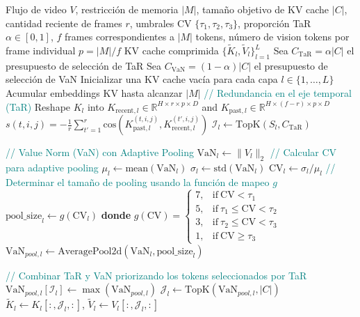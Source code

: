 \newpage
\begin{algorithm}[t]
\footnotesize
\caption{Algoritmo de InfiniPot-V}
\label{alg:infinipot_v}
\begin{algorithmic}[1]
\Require Flujo de video ${V}$, restricción de memoria $|M|$, tamaño objetivo de KV cache $|C|$, cantidad reciente de frames $r$, umbrales CV $\{\tau_1, \tau_2, \tau_3\}$, proporción TaR $\alpha \in [0,1]$, $f$ frames correspondientes a $|M|$ tokens, número de vision tokens por frame individual $p=|M|/f$ 
\Ensure KV cache comprimida $\{\tilde{K}_l, \tilde{V}_l\}_{l=1}^L$
\State Sea $C_{\text{TaR}} = \alpha|C|$ el presupuesto de selección de TaR
\State Sea $C_{\text{VaN}} = (1-\alpha)|C|$ el presupuesto de selección de VaN
\State Inicializar una KV cache vacía para cada capa $l \in \{1,\ldots,L\}$
    \State Acumular embeddings KV hasta alcanzar $|M|$ 
        \State \textcolor{teal}{// Redundancia en el eje temporal (TaR)}
        \State Reshape $K_l$ into $K_{\text{recent},l} \in \mathbb{R}^{H \times r \times p \times D}$ and $K_{\text{past},l} \in \mathbb{R}^{H \times (f-r) \times p \times D}$
            \State $s(t,i,j) = -\frac{1}{r}\sum_{t'=1}^{r}\text{cos}(K_{\text{past},l}^{(t,i,j)}, K_{\text{recent},l}^{(t',i,j)})$
        \EndFor
        \State $\mathcal{I}_l \gets \text{TopK}(S_l, C_{\text{TaR}})$ 
        
        \State \textcolor{teal}{// Value Norm (VaN) con Adaptive Pooling}
        \State $\text{VaN}_l \gets \|V_l\|_2$
        \State \textcolor{teal}{// Calcular CV para adaptive pooling}
        \State $\mu_l \gets \text{mean}(\text{VaN}_l)$
        \State $\sigma_l \gets \text{std}(\text{VaN}_l)$
        \State $\text{CV}_l \gets \sigma_l / \mu_l$
        \State \textcolor{teal}{// Determinar el tamaño de pooling usando la función de mapeo $g$}
\State $\text{pool\_size}_l \gets g(\text{CV}_l)$ 
\State \textbf{donde} $g(\text{CV}) = 
\begin{cases}
    7, & \text{if}\ \text{CV} < \tau_1 \\
    5, & \text{if}\ \tau_1 \leq \text{CV} < \tau_2 \\
    3, & \text{if}\ \tau_2 \leq \text{CV} < \tau_3 \\
    1, & \text{if}\ \text{CV} \geq \tau_3
\end{cases}$
        \State $\text{VaN}_{pool,l} \gets \text{AveragePool2d}(\text{VaN}_l, \text{pool\_size}_l)$
        
        \State \textcolor{teal}{// Combinar TaR y VaN priorizando los tokens seleccionados por TaR}
        \State $\text{VaN}_{pool,l}[\mathcal{I}_l] \gets \max(\text{VaN}_{pool,l})$ 
        \State $\mathcal{J}_l \gets \text{TopK}(\text{VaN}_{pool,l}, |C|)$ 
        \State $\tilde{K}_l \gets K_l[:, \mathcal{J}_l, :]$, $\tilde{V}_l \gets V_l[:, \mathcal{J}_l, :]$ 
    \EndFor
\EndWhile
\end{algorithmic}
\end{algorithm}
